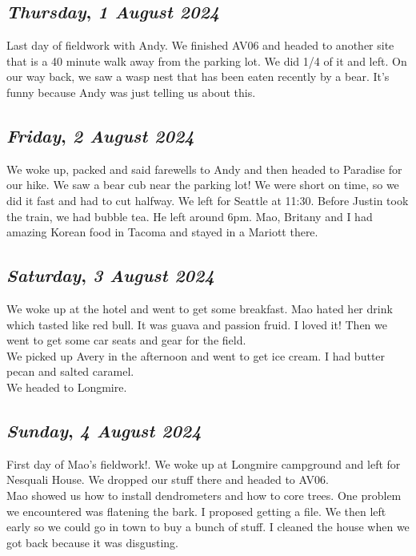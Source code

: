 \begin{center}
\section*{\month}
\end{center}

\def\day{\textit{1 August 2024}}
\def\weekday{\textit{Thursday}}
\subsection*{\weekday, \day}
Last day of fieldwork with Andy. We finished AV06 and headed to another site that is a 40 minute walk away from the parking lot. We did 1/4 of it and left. On our way back, we saw a wasp nest that has been eaten recently by a bear. It's funny because Andy was just telling us about this. 

\def\day{\textit{2 August 2024}}
\def\weekday{\textit{Friday}}
\subsection*{\weekday, \day}
We woke up, packed and said farewells to Andy and then headed to Paradise for our hike. We saw a bear cub near the parking lot! We were short on time, so we did it fast and had to cut halfway. We left for Seattle at 11:30. Before Justin took the train, we had bubble tea. He left around 6pm. Mao, Britany and I had amazing Korean food in Tacoma and stayed in a Mariott there. 

\def\day{\textit{3 August 2024}}
\def\weekday{\textit{Saturday}}
\subsection*{\weekday, \day}
We woke up at the hotel and went to get some breakfast. Mao hated her drink which tasted like red bull. It was guava and passion fruid. I loved it! Then we went to get some car seats and gear for the field.\\
We picked up Avery in the afternoon and went to get ice cream. I had butter pecan and salted caramel. \\
We headed to Longmire. 

\def\day{\textit{4 August 2024}}
\def\weekday{\textit{Sunday}}
\subsection*{\weekday, \day}
First day of Mao's fieldwork!. We woke up at Longmire campground and left for Nesquali House. We dropped our stuff there and headed to AV06. \\
Mao showed us how to install dendrometers and how to core trees. One problem we encountered was flatening the bark. I proposed getting a file. We then left early so we could go in town to buy a bunch of stuff. I cleaned the house when we got back because it was disgusting. 

